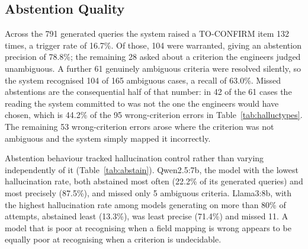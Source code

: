 \documentclass[applsci,article,submit,pdftex,oneauthor]{Definitions/mdpi}
\begin{document}
\subsection{Abstention Quality}\label{sec:abst}
Across the 791 generated queries the system raised a TO-CONFIRM item 132 times,
a trigger rate of 16.7\%. Of those, 104 were warranted, giving an abstention
precision of 78.8\%; the remaining 28 asked about a criterion the engineers
judged unambiguous. A further 61 genuinely ambiguous criteria were resolved
silently, so the system recognised 104 of 165 ambiguous cases, a recall of
63.0\%. Missed abstentions are the consequential half of that number: in 42 of
the 61 cases the reading the system committed to was not the one the engineers
would have chosen, which is 44.2\% of the 95 wrong-criterion errors in
Table~\ref{tab:halluctypes}. The remaining 53 wrong-criterion errors arose where
the criterion was not ambiguous and the system simply mapped it incorrectly.

Abstention behaviour tracked hallucination control rather than varying
independently of it (Table~\ref{tab:abstain}). Qwen2.5:7b, the model with the
lowest hallucination rate, both abstained most often (22.2\% of its generated
queries) and most precisely (87.5\%), and missed only 5 ambiguous criteria.
Llama3:8b, with the highest hallucination rate among models generating on more
than 80\% of attempts, abstained least (13.3\%), was least precise (71.4\%) and
missed 11. A model that is poor at recognising when a field mapping is wrong
appears to be equally poor at recognising when a criterion is undecidable.
\end{document}
